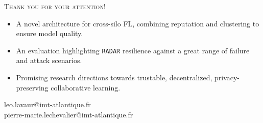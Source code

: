 \begin{frame}
  \centering\scshape\large Thank you for your attention!

  \vfill
  
  \normalshape\normalsize

  
  \raggedright
  \begin{itemize}
    \item A novel architecture for cross-silo FL, combining reputation and clustering to ensure model quality.
    \item An evaluation highlighting \texttt{RADAR} resilience against a great range of failure and attack scenarios.
    \item Promising research directions towards trustable, decentralized, privacy-preserving collaborative learning.
  \end{itemize}

  \vfill

  \centering\small
  leo.lavaur@imt-atlantique.fr\\
  pierre-marie.lechevalier@imt-atlantique.fr

\end{frame}


